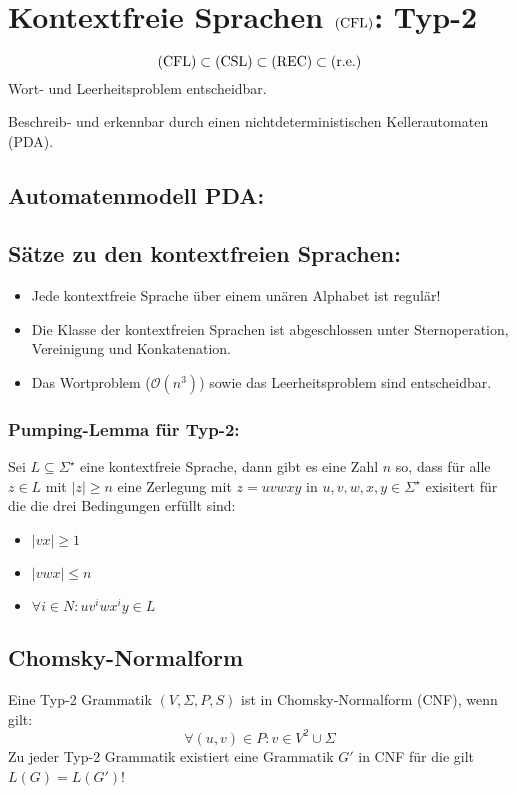\chapter{Kontextfreie Sprachen $\mathrm{(CFL)}$: Typ-2}
\begin{equation*}
	\mathrm{(CFL)}\subset\mathrm{(CSL)}\subset\mathrm{(REC)}\subset\mathrm{(r.e.)}
\end{equation*}
Wort- und Leerheitsproblem entscheidbar.

Beschreib- und erkennbar durch einen nichtdeterministischen Kellerautomaten (PDA).
\section{Automatenmodell PDA:}


\section{Sätze zu den kontextfreien Sprachen:}
\begin{itemize}
	\item Jede kontextfreie Sprache über einem unären Alphabet ist regulär!
	\item Die Klasse der kontextfreien Sprachen ist abgeschlossen unter Sternoperation, Vereinigung und Konkatenation.
	\item Das Wortproblem ($\mathcal O(n^3)$) sowie das Leerheitsproblem sind entscheidbar.
\end{itemize}
\subsection{Pumping-Lemma für Typ-2:}
Sei $L\subseteq \Sigma^\star$ eine kontextfreie Sprache, dann gibt es eine Zahl $n$ so, dass für alle $z\in L$ mit $|z|\geq n$ eine Zerlegung mit $z=uvwxy$ in $u,v,w,x,y\in\Sigma^\star$ exisitert für die die drei Bedingungen erfüllt sind:
\begin{itemize}
	\item $|vx|\geq 1$
	\item $|vwx|\leq n$
	\item $\forall i\in N: uv^iwx^iy\in L$
\end{itemize}


\section{Chomsky-Normalform}
Eine Typ-2 Grammatik $(V,\Sigma,P,S)$ ist in Chomsky-Normalform (CNF),  wenn gilt:
\begin{equation*}
	\forall (u,v)\in P: v\in V^2\cup \Sigma
\end{equation*}
Zu jeder Typ-2 Grammatik existiert eine Grammatik $G'$ in CNF für die gilt $L(G)=L(G')$!
